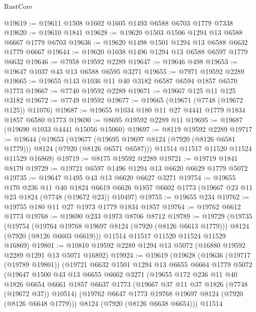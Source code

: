 \begin{lexlean}{RustCore}
\begin{coremodule}
@19619 := @19611 @1508 @1602 @1605 @1493 @6588 @6703 @1779 @7338
@19620 := @19610 @1841
@19628 := @19620 @1503 @1506 @1294 @13 @6588 @6667 @1779 @6703
@19636 := @19620 @1498 @1501 @1294 @13 @6588 @6632 @1779 @6667
@19644 := @19620 @1038 @1496 @1294 @13 @6588 @6597 @1779 @6632
@19646 := @7958 @19592 @2289
@19647 := @19646 @498
@19653 := @19647 @1037 @43 @13 @6588 @6595 @3271
@19655 := @7971 @19592 @2289
@19665 := @19655 @143 @1036 @11 @40 @3182 @6587 @6594 @1857 @6570 @1773
@19667 := @7740 @19592 @2289
@19671 := @19667 @125 @11 @125 @3182
@19672 := @7749 @19592
@19677 := @19665 (@19671 (@7748 (@19672 @125)) @11076)
@19687 := @19655 @1034 @180 @11 @27 @4441 @1779 @1834 @1857 @6580 @1773
@19690 := @8695 @19592 @2289 @11
@19695 := @19687 (@19690 @1033 @4441 @15056 @15060)
@19697 := @8119 @19592 @2289
@19717 := @19644
    (@19653
      (@19677 (@19695 @19697 @8124 (@7920 (@8126 @6581 @1779))) @8124 (@7920 (@8126 @6571 @6587)))
      @11514
      @11517
      @11520
      @11524
      @11529
      @16869)
@19719 := @8175 @19592 @2289
@19721 := @19719 @1841 @8179
@19729 := @19721 @6597 @1496 @1294 @13 @6620 @6629 @1779 @5072
@19735 := @19647 @1495 @43 @13 @6620 @6627 @3271
@19754 := @19655
    @170
    @236
    @11
    @40
    @1824
    @6619
    @6626
    @1857
    @6602
    @1773
    (@19667 @23 @11 @23 @1824 (@7748 (@19672 @23)) @10497)
@19755 := @19655 @234
@19762 := @19755 @180 @11 @27 @1973 @1779 @1834 @1857
@19764 := @19762 @6612 @1773
@19768 := @19690 @233 @1973 @8706 @8712
@19789 := @19729
    (@19735
      (@19754
        (@19764 @19768 @19697 @8124 (@7920 (@8126 @6613 @1779)))
        @8124
        (@7920 (@8126 @6603 @6619)))
      @11514
      @11517
      @11520
      @11524
      @11529
      @16869)
@19801 := @10810 @19592 @2289 @1294 @13 @5072 (@16880 @19592 @2289 @1291 @13 @5071 @16892)
@19924 := @19619
    (@19628
      (@19636
        (@19717 (@19789 @19801))
        (@19721
          @6632
          @1501
          @1294
          @13
          @6655
          @6664
          @1779
          @5072
          (@19647
            @1500
            @43
            @13
            @6655
            @6662
            @3271
            (@19655
              @172
              @236
              @11
              @40
              @1826
              @6654
              @6661
              @1857
              @6637
              @1773
              (@19667 @37 @11 @37 @1826 (@7748 (@19672 @37)) @10514)
              (@19762 @6647 @1773 @19768 @19697 @8124 (@7920 (@8126 @6648 @1779)))
              @8124
              (@7920 (@8126 @6638 @6654)))
            @11514

\end{coremodule}
\end{lexlean}
